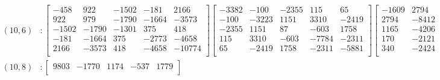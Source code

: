 \documentclass[12pt]{amsart}
\theoremstyle{plain}
\theoremstyle{definition}
\begin{document}
\begin{landscape}
\thispagestyle{empty}
\tiny
\begin{align*} 
(10,6) &:
\begin{bmatrix}
-458  &   922  &   -1502  &   -181  &   2166  \\ 
 922  &   979  &   -1790  &   -1664  &   -3573  \\ 
 -1502  &   -1790  &   -1301  &   375  &   418  \\ 
 -181  &   -1664  &   375  &   -2773  &   -4658  \\ 
 2166  &   -3573  &   418  &   -4658  &   -10774  \\ 
\end{bmatrix}
\begin{bmatrix}
-3382  &   -100  &   -2355  &   115  &   65  \\ 
 -100  &   -3223  &   1151  &   3310  &   -2419  \\ 
 -2355  &   1151  &   87  &   -603  &   1758  \\ 
 115  &   3310  &   -603  &   -7784  &   -2311  \\ 
 65  &   -2419  &   1758  &   -2311  &   -5881  \\ 
\end{bmatrix}
\begin{bmatrix}
-1609  &   2794  &   1165  &   170  &   340  \\ 
 2794  &   -8412  &   -4206  &   -2121  &   -2424  \\ 
 1165  &   -4206  &   -2310  &   2017  &   2928  \\ 
 170  &   -2121  &   2017  &   -1949  &   -4341  \\ 
 340  &   -2424  &   2928  &   -4341  &   -4840  \\ 
\end{bmatrix}
\begin{bmatrix}
-304  &   -858  &   1527  &   -175  &   -1370  \\ 
 -858  &   -1405  &   837  &   1026  &   2339  \\ 
 1527  &   837  &   -1556  &   -2200  &   -1657  \\ 
 -175  &   1026  &   -2200  &   1395  &   3836  \\ 
 -1370  &   2339  &   -1657  &   3836  &   3827  \\ 
\end{bmatrix}
\\
(10,8) &:
\begin{bmatrix}
9803  &   -1770  &   1174  &   -537  &   1779  \\ 

\end{bmatrix}
\end{align*}
\end{landscape}
\end{document}
